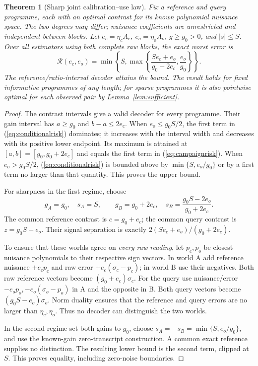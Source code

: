 \documentclass[11pt,letterpaper]{article}
\newtheorem{theorem}{Theorem}[section]
\theoremstyle{definition}\newtheorem{definition}[theorem]{Definition}
\theoremstyle{remark}\newtheorem{remark}[theorem]{Remark}
\begin{document}
\begin{theorem}[Sharp joint calibration--use law]
\label{thm:campaign}
Fix a reference and query programme, each with an optimal contrast for its known polynomial nuisance space. The two degrees may differ; nuisance coefficients are unrestricted and independent between blocks. Let $e_c=\eta_c A_c$, $e_o=\eta_o A_o$, $g\ge g_0>0$, and $|s|\le S$. Over all estimators using \emph{both complete raw blocks}, the exact worst error is
\begin{equation}
 \boxed{\quad
 \mathcal R(e_c,e_o)=
 \min\left\{S,\max\left\{\frac{S e_c+e_o}{g_0+2e_c},\frac{e_o}{g_0}\right\}\right\}.
 \quad}
 \label{eq:campaignrisk}
\end{equation}
The reference/ratio-interval decoder attains the bound. The result holds for fixed informative programmes of any length; for sparse programmes it is also pointwise optimal for each observed pair by Lemma~\ref{lem:sufficient}.
\end{theorem}
\begin{proof}
The contrast intervals give a valid decoder for every programme. Their gain interval has $a\ge g_0$ and $b-a\le2e_c$. When $e_o\le g_0S/2$, the first term in (\ref{eq:conditionalrisk}) dominates; it increases with the interval width and decreases with its positive lower endpoint. Its maximum is attained at $[a,b]=[g_0,g_0+2e_c]$ and equals the first term in (\ref{eq:campaignrisk}). When $e_o>g_0S/2$, (\ref{eq:conditionalrisk}) is bounded above by $\min\{S,e_o/g_0\}$ or by a first term no larger than that quantity. This proves the upper bound.

For sharpness in the first regime, choose
\begin{equation}
 g_A=g_0,\quad s_A=S,\qquad
 g_B=g_0+2e_c,\quad s_B=\frac{g_0S-2e_o}{g_0+2e_c}.
 \label{eq:campaignworlds}
\end{equation}
The common reference contrast is $c=g_0+e_c$; the common query contrast is $z=g_0S-e_o$. Their signal separation is exactly $2(Se_c+e_o)/(g_0+2e_c)$.

To ensure that these worlds agree on \emph{every raw reading}, let $p_c,p_o$ be closest nuisance polynomials to their respective sign vectors. In world A add reference nuisance $+e_cp_c$ and raw error $+e_c(\sigma_c-p_c)$; in world B use their negatives. Both raw reference vectors become $(g_0+e_c)\sigma_c$. For the query use nuisance/error $-e_op_o,-e_o(\sigma_o-p_o)$ in A and the opposite in B. Both query vectors become $(g_0S-e_o)\sigma_o$. Norm duality ensures that the reference and query errors are no larger than $\eta_c,\eta_o$. Thus no decoder can distinguish the two worlds.

In the second regime set both gains to $g_0$, choose $s_A=-s_B=\min\{S,e_o/g_0\}$, and use the known-gain zero-transcript construction. A common exact reference supplies no distinction. The resulting lower bound is the second term, clipped at $S$. This proves equality, including zero-noise boundaries.
\end{proof}
\end{document}
